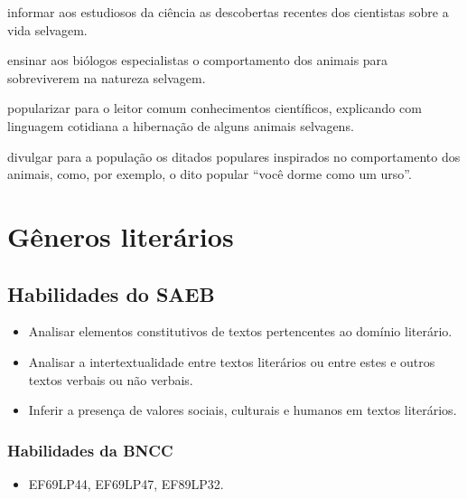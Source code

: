\begin{escolha}

\item informar aos estudiosos da ciência as descobertas recentes dos cientistas sobre a vida selvagem.

\item ensinar aos biólogos especialistas o comportamento dos animais para sobreviverem na natureza selvagem.

\item popularizar para o leitor comum conhecimentos científicos, explicando
com linguagem cotidiana a hibernação de alguns animais selvagens.

\item divulgar para a população os ditados populares inspirados no
comportamento dos animais, como, por exemplo, o dito popular ``você dorme como um urso''.
\end{escolha}

\chapter{Gêneros literários}

\section*{Habilidades do SAEB} 

\begin{itemize}
  \item
Analisar elementos constitutivos de
textos pertencentes ao domínio literário.
\item Analisar a intertextualidade
entre textos literários ou entre estes e outros textos verbais ou não
verbais.
\item Inferir a presença de valores sociais, culturais e humanos em
textos literários.
\end{itemize}

\subsection{Habilidades da BNCC}

\begin{itemize}
\tightlist
\item
  EF69LP44, EF69LP47, EF89LP32.
\end{itemize}


